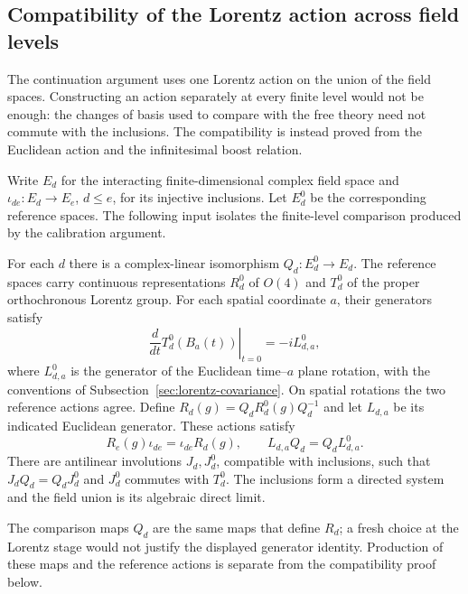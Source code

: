 \subsection{Compatibility of the Lorentz action across field levels}
\label{sec:label-descent}
The continuation argument uses one Lorentz action on the union of the field
spaces. Constructing an action separately at every finite level would not
be enough: the changes of basis used to compare with the free theory need
not commute with the inclusions. The compatibility is instead proved from
the Euclidean action and the infinitesimal boost relation.

Write $E_d$ for the interacting finite-dimensional complex field space and
$\iota_{de}:E_d\to E_e$, $d\leq e$, for its injective inclusions. Let
$E_d^0$ be the corresponding reference spaces. The following input isolates
the finite-level comparison produced by the calibration argument.
\begin{assumption}\label{input:calibrated-actions}
For each $d$ there is a complex-linear isomorphism $Q_d:E_d^0\to E_d$.
The reference spaces carry continuous representations $R_d^0$ of $O(4)$
and $T_d^0$ of the proper orthochronous Lorentz group. For each spatial
coordinate $a$, their generators satisfy
\[
 \left.\frac{d}{dt}T_d^0(B_a(t))\right|_{t=0}=-iL_{d,a}^0,
\]
where $L_{d,a}^0$ is the generator of the Euclidean time--$a$ plane
rotation, with the conventions of Subsection~\ref{sec:lorentz-covariance}.
On spatial rotations the two reference actions agree. Define
$R_d(g)=Q_dR_d^0(g)Q_d^{-1}$ and let $L_{d,a}$ be its indicated
Euclidean generator. These actions satisfy
\[
 R_e(g)\iota_{de}=\iota_{de}R_d(g),\qquad
 L_{d,a}Q_d=Q_dL_{d,a}^0.
\]
There are antilinear involutions $J_d,J_d^0$, compatible with inclusions,
such that $J_dQ_d=Q_dJ_d^0$ and $J_d^0$ commutes with $T_d^0$.
The inclusions form a directed system and the field union is its algebraic
direct limit.
\end{assumption}
The comparison maps $Q_d$ are the same maps that define $R_d$; a fresh
choice at the Lorentz stage would not justify the displayed generator
identity. Production of these maps and the reference actions is separate
from the compatibility proof below.

